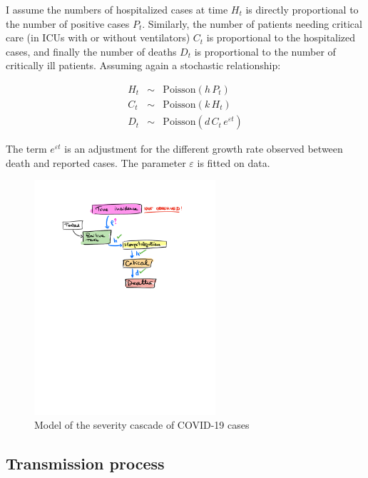 \documentclass[12pt]{article}
\newcommand{\pois}{\mathrm{Poisson}}
\begin{document}
I assume the numbers of hospitalized cases at time $H_t$ is directly proportional to the number of positive cases $P_t$. Similarly, the number of patients needing critical care (in ICUs with or without ventilators) $C_t$ is proportional to the hospitalized cases, and finally the number of deaths $D_t$ is proportional to the number of critically ill patients. Assuming again a stochastic relationship:

\begin{eqnarray}
H_t & \sim &\pois(h\, P_t)\\
C_t & \sim &\pois(k\, H_t)\\
D_t & \sim &\pois(d\, C_t\, e^{\varepsilon t})
\end{eqnarray}

The term $e^{\varepsilon t}$ is an adjustment for the different growth rate observed between death and reported cases. The parameter $\varepsilon$ is fitted on data. 


\begin{figure}[htbp]
\begin{center}
\includegraphics[width = 0.6\textwidth]{cascade.pdf}
\caption{Model of the severity cascade of COVID-19 cases}
\label{fig:cascade}
\end{center}
\end{figure}




\subsection{Transmission process}
\end{document}
